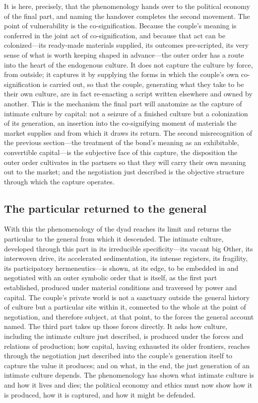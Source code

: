 It is here, precisely, that the phenomenology hands over to the political economy of the final part, and naming the handover completes the second movement. The point of vulnerability is the co-signification. Because the couple's meaning is conferred in the joint act of co-signification, and because that act can be colonized---its ready-made materials supplied, its outcomes pre-scripted, its very sense of what is worth keeping shaped in advance---the outer order has a route into the heart of the endogenous culture. It does not capture the culture by force, from outside; it captures it by supplying the forms in which the couple's own co-signification is carried out, so that the couple, generating what they take to be their own culture, are in fact re-enacting a script written elsewhere and owned by another. This is the mechanism the final part will anatomize as the capture of intimate culture by capital: not a seizure of a finished culture but a colonization of its generation, an insertion into the co-signifying moment of materials the market supplies and from which it draws its return. The second misrecognition of the previous section---the treatment of the bond's meaning as an exhibitable, convertible capital---is the subjective face of this capture, the disposition the outer order cultivates in the partners so that they will carry their own meaning out to the market; and the negotiation just described is the objective structure through which the capture operates.

\subsection*{The particular returned to the general}

With this the phenomenology of the dyad reaches its limit and returns the particular to the general from which it descended. The intimate culture, developed through this part in its irreducible specificity---its vacant big Other, its interwoven drive, its accelerated sedimentation, its intense registers, its fragility, its participatory hermeneutics---is shown, at its edge, to be embedded in and negotiated with an outer symbolic order that is itself, as the first part established, produced under material conditions and traversed by power and capital. The couple's private world is not a sanctuary outside the general history of culture but a particular site within it, connected to the whole at the point of negotiation, and therefore subject, at that point, to the forces the general account named. The third part takes up those forces directly. It asks how culture, including the intimate culture just described, is produced under the forces and relations of production; how capital, having exhausted its older frontiers, reaches through the negotiation just described into the couple's generation itself to capture the value it produces; and on what, in the end, the just generation of an intimate culture depends. The phenomenology has shown what intimate culture is and how it lives and dies; the political economy and ethics must now show how it is produced, how it is captured, and how it might be defended.
